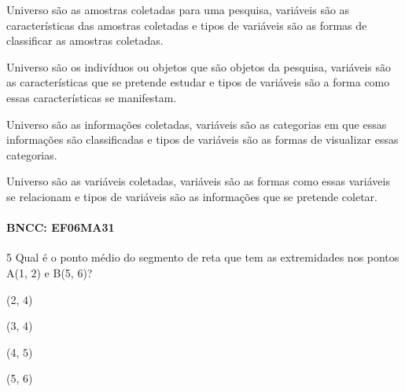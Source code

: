 {\begin{escolha}
\item Universo são as amostras coletadas para uma pesquisa, variáveis são
as características das amostras coletadas e tipos de variáveis são as
formas de classificar as amostras coletadas.
\item Universo são os indivíduos ou objetos que são objetos da pesquisa,
variáveis são as características que se pretende estudar e tipos de
variáveis são a forma como essas características se manifestam.
\item Universo são as informações coletadas, variáveis são as categorias em
que essas informações são classificadas e tipos de variáveis são as
formas de visualizar essas categorias.
\item Universo são as variáveis coletadas, variáveis são as formas como
essas variáveis se relacionam e tipos de variáveis são as informações
que se pretende coletar.
\end{escolha}

\paragraph{BNCC: EF06MA31}


\num{5}  Qual é o ponto médio do segmento de reta que tem as extremidades nos
pontos A(1, $2$) e B(5, $6$)?

\begin{escolha}
\item (2, $4$)
\item (3, $4$)
\item (4, $5$)
\item (5, $6$)
\end{escolha}


}
